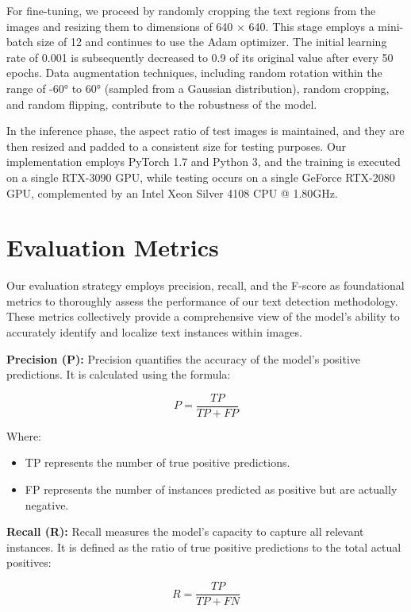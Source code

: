 For fine-tuning, we proceed by randomly cropping the text regions from the images and resizing them to dimensions of 640 × 640. This stage employs a mini-batch size of 12 and continues to use the Adam optimizer. The initial learning rate of 0.001 is subsequently decreased to 0.9 of its original value after every 50 epochs. Data augmentation techniques, including random rotation within the range of -60° to 60° (sampled from a Gaussian distribution), random cropping, and random flipping, contribute to the robustness of the model.

In the inference phase, the aspect ratio of test images is maintained, and they are then resized and padded to a consistent size for testing purposes. Our implementation employs PyTorch 1.7 and Python 3, and the training is executed on a single RTX-3090 GPU, while testing occurs on a single GeForce RTX-2080 GPU, complemented by an Intel Xeon Silver 4108 CPU @ 1.80GHz.

\section{Evaluation Metrics}
Our evaluation strategy employs precision, recall, and the F-score as foundational metrics to thoroughly assess the performance of our text detection methodology. These metrics collectively provide a comprehensive view of the model's ability to accurately identify and localize text instances within images.

\textbf{Precision (P):} Precision quantifies the accuracy of the model's positive predictions. It is calculated using the formula:

\begin{equation}
P = \frac{TP}{TP + FP}
\end{equation}

Where: \\
\begin{itemize}
    \item TP represents the number of true positive predictions.
    \item FP represents the number of instances predicted as positive but are actually negative. \\
\end{itemize}

\textbf{Recall (R):} Recall measures the model's capacity to capture all relevant instances. It is defined as the ratio of true positive predictions to the total actual positives:

\begin{equation}
R = \frac{TP}{TP + FN}
\end{equation}

